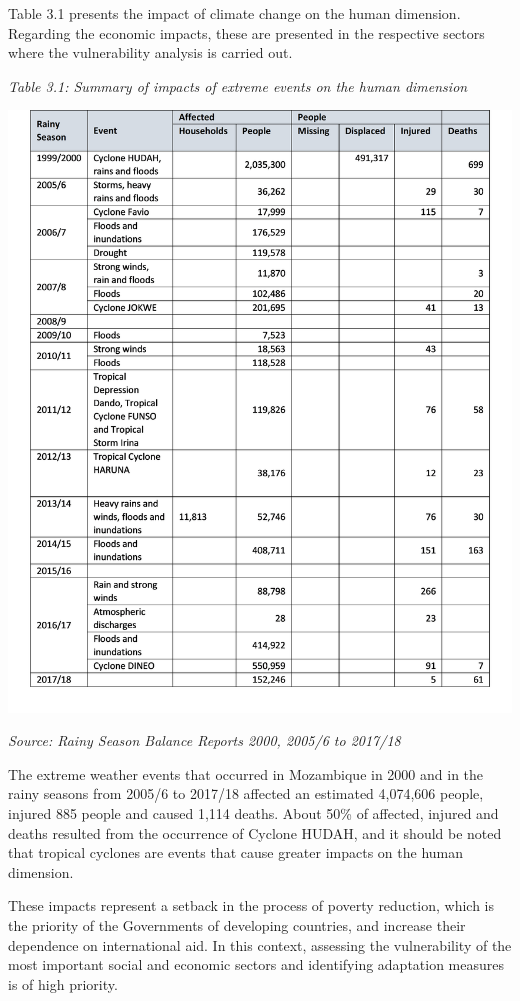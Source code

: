 \documentclass[
]{book}
\begin{document}
Table 3.1 presents the impact of climate change on the human dimension. Regarding the economic impacts, these are presented in the respective sectors where the vulnerability analysis is carried out.

\emph{Table 3.1: Summary of impacts of extreme events on the human dimension}

\includegraphics{Extreme-human.png}

\emph{Source: Rainy Season Balance Reports 2000, 2005/6 to 2017/18}

The extreme weather events that occurred in Mozambique in 2000 and in the rainy seasons from 2005/6 to 2017/18 affected an estimated 4,074,606 people, injured 885 people and caused 1,114 deaths. About 50\% of affected, injured and deaths resulted from the occurrence of Cyclone HUDAH, and it should be noted that tropical cyclones are events that cause greater impacts on the human dimension.

These impacts represent a setback in the process of poverty reduction, which is the priority of the Governments of developing countries, and increase their dependence on international aid. In this context, assessing the vulnerability of the most important social and economic sectors and identifying adaptation measures is of high priority.
\end{document}
